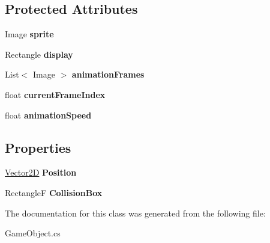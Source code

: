 \subsection*{Protected Attributes}
\begin{DoxyCompactItemize}
\item 
\hypertarget{class_mage_twinstick_1_1_game_object_a0d553d62b8d1e865b6f106c6b3b110fe}{}Image {\bfseries sprite}\label{class_mage_twinstick_1_1_game_object_a0d553d62b8d1e865b6f106c6b3b110fe}

\item 
\hypertarget{class_mage_twinstick_1_1_game_object_a5807df7f837dc87c8955a008d0b27b50}{}Rectangle {\bfseries display}\label{class_mage_twinstick_1_1_game_object_a5807df7f837dc87c8955a008d0b27b50}

\item 
\hypertarget{class_mage_twinstick_1_1_game_object_a8cc6f0911171f56d011803b3ab70a7b5}{}List$<$ Image $>$ {\bfseries animation\+Frames}\label{class_mage_twinstick_1_1_game_object_a8cc6f0911171f56d011803b3ab70a7b5}

\item 
\hypertarget{class_mage_twinstick_1_1_game_object_a5a94b322db89e1230005a33f1205e742}{}float {\bfseries current\+Frame\+Index}\label{class_mage_twinstick_1_1_game_object_a5a94b322db89e1230005a33f1205e742}

\item 
\hypertarget{class_mage_twinstick_1_1_game_object_a5d21c31402c27c5a19f2a62d98720456}{}float {\bfseries animation\+Speed}\label{class_mage_twinstick_1_1_game_object_a5d21c31402c27c5a19f2a62d98720456}

\end{DoxyCompactItemize}
\subsection*{Properties}
\begin{DoxyCompactItemize}
\item 
\hypertarget{class_mage_twinstick_1_1_game_object_a74cf54e9808f3a9f93fa5c837076a7f0}{}\hyperlink{class_mage_twinstick_1_1_vector2_d}{Vector2\+D} {\bfseries Position}\label{class_mage_twinstick_1_1_game_object_a74cf54e9808f3a9f93fa5c837076a7f0}

\item 
\hypertarget{class_mage_twinstick_1_1_game_object_a66a2645b4fda01d5dd2f5e311c338b90}{}Rectangle\+F {\bfseries Collision\+Box}\label{class_mage_twinstick_1_1_game_object_a66a2645b4fda01d5dd2f5e311c338b90}

\end{DoxyCompactItemize}


The documentation for this class was generated from the following file\+:\begin{DoxyCompactItemize}
\item 
Game\+Object.\+cs\end{DoxyCompactItemize}
